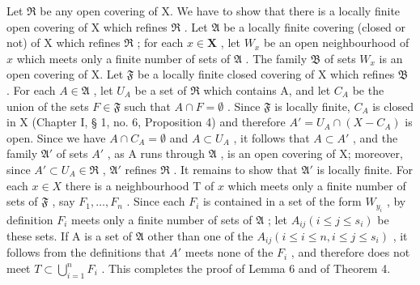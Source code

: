 Let \(\mathfrak{R}\) be any open covering of X. We have to show that there is a locally finite open covering of X which refines \(\mathfrak{R}\) . Let \(\mathfrak{A}\) be a locally finite covering (closed or not) of X which refines \(\mathfrak{R}\) ; for each \(x \in \mathbf{X}\) , let \(W_x\) be an open neighbourhood of \(x\) which meets only a finite number of sets of \(\mathfrak{A}\) . The family \(\mathfrak{B}\) of sets \(W_x\) is an open covering of X. Let \(\mathfrak{F}\) be a locally finite closed covering of X which refines \(\mathfrak{B}\) . For each \(A \in \mathfrak{A}\) , let \(U_A\) be a set of \(\mathfrak{R}\) which contains A, and let \(C_A\) be the union of the sets \(F \in \mathfrak{F}\) such that \(A \cap F = \emptyset\) . Since \(\mathfrak{F}\) is locally finite, \(C_A\) is closed in X (Chapter I, § 1, no. 6, Proposition 4) and therefore \(A' = U_A \cap (X - C_A)\) is open. Since we have \(A \cap C_A = \emptyset\) and \(A \subset U_A\) , it follows that \(A \subset A'\) , and the family \(\mathfrak{A}'\) of sets \(A'\) , as A runs through \(\mathfrak{A}\) , is an open covering of X; moreover, since \(A' \subset U_A \in \mathfrak{R}\) , \(\mathfrak{A}'\) refines \(\mathfrak{R}\) . It remains to show that \(\mathfrak{A}'\) is locally finite. For each \(x \in X\) there is a neighbourhood T of \(x\) which meets only a finite number of sets of \(\mathfrak{F}\) , say \(F_1, \ldots, F_n\) . Since each \(F_i\) is contained in a set of the form \(W_{y_i}\) , by definition \(F_i\) meets only a finite number of sets of \(\mathfrak{A}\) ; let \(A_{ij} (i \leqslant j \leqslant s_i)\) be these sets. If A is a set of \(\mathfrak{A}\) other than one of the \(A_{ij} (i \leqslant i \leqslant n, i \leqslant j \leqslant s_i)\) , it follows from the definitions that \(A'\) meets none of the \(F_i\) , and therefore does not meet \(T \subset \bigcup_{i=1}^{n} F_i\) . This completes the proof of Lemma 6 and of Theorem 4.

